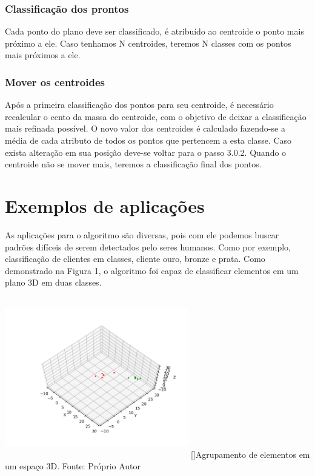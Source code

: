 \documentclass[a4paper,11pt]{article}
\newenvironment{Figure}
  {\par\medskip\noindent\minipage{\linewidth}}
    {\endminipage\par\medskip}
\begin{document}
\begin{multicols}{2}
\subsubsection{Classificação dos prontos}
Cada ponto do plano deve ser classificado, é atribuído ao centroide o ponto mais próximo a ele. Caso tenhamos N centroides, teremos N classes com os pontos mais próximos a ele.

\subsubsection{Mover os centroides}
Após a primeira classificação dos pontos para seu centroide, é necessário recalcular o cento da massa do centroide, com o objetivo de deixar a classificação mais refinada possível.  O novo valor dos centroides é calculado fazendo-se a média de cada atributo de todos os pontos que pertencem a esta classe. Caso exista alteração em sua posição deve-se voltar para o passo 3.0.2. Quando o centroide não se mover mais, teremos a classificação final dos pontos.

\section{Exemplos de aplicações}
As aplicações para o algoritmo são diversas, pois com ele podemos buscar padrões difíceis de serem detectados pelo seres humanos. Como por exemplo, classificação de clientes em classes, cliente ouro, bronze e prata. Como demonstrado na Figura 1, o algoritmo foi capaz de classificar elementos em um plano 3D em duas classes.

\begin{Figure}
	\centering 
	\includegraphics[width=8cm, height=7cm]{figura1}
	[]{Agrupamento de elementos em um espaço 3D. Fonte: Próprio Autor}
	\label{medium}
\end{Figure}





\end{multicols}
\end{document}
